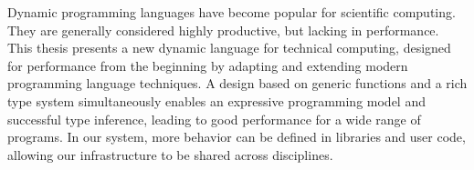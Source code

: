 % 
% 
%
Dynamic programming languages have become popular for scientific
computing. They are generally considered highly productive, but lacking in
performance. This thesis presents a new dynamic language for technical
computing, designed for performance from the beginning by adapting and
extending modern programming language techniques. A design
based on generic functions and a rich type system simultaneously enables
an expressive programming model and successful type inference, leading
to good performance for a wide range of programs.
In our system, more behavior can be defined in libraries and user code,
allowing our infrastructure to be shared across disciplines.
